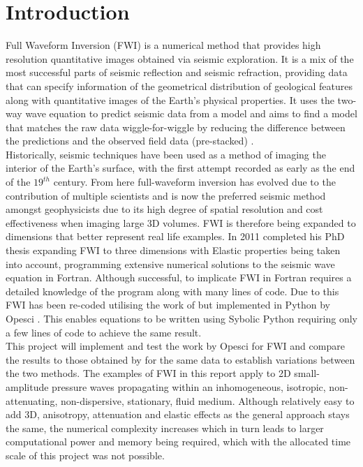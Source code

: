 \chapter{Introduction}
\label{intro}


Full Waveform Inversion (FWI) is a numerical method that provides high resolution quantitative images obtained via seismic exploration. It is a mix of the most successful parts of seismic reflection and seismic refraction, providing data that can specify information of the geometrical distribution of geological features along with quantitative images of the Earth's physical properties. 
It uses the two-way wave equation to predict seismic data from a model and aims to find a model that matches the raw data wiggle-for-wiggle by reducing the difference between the predictions and the observed field data (pre-stacked) \citep{tarantola2005inverse}. \\
 
Historically, seismic techniques have been used as a method of imaging the interior of the Earth's surface, with the first attempt recorded as early as the end of the $19^{th}$ century. From here full-waveform inversion has evolved due to the contribution of multiple scientists and is now the preferred seismic method amongst geophysicists due to its high degree of spatial resolution and cost effectiveness when imaging large 3D volumes. FWI is therefore being expanded to dimensions that better represent real life examples. In 2011 \citet{guasch20123d} completed his PhD thesis expanding FWI to three dimensions with Elastic properties being taken into account, programming extensive numerical solutions to the seismic wave equation in Fortran. Although successful, to implicate FWI in Fortran requires a detailed knowledge of the program along with many lines of code. Due to this FWI has been re-coded utilising the work of \citep{guasch20123d} but implemented in Python by Opesci  \citep{bworld}.  This enables equations to be written using Sybolic Python requiring only a few lines of code to achieve the same result. \\

This project will implement and test the work by Opesci for FWI and compare the results to those obtained by \citep{guasch20123d} for the same data to establish variations between the two methods. The examples of FWI in this report apply to 2D small-amplitude pressure waves propagating within an inhomogeneous, isotropic, non-attenuating, non-dispersive, stationary, fluid medium. Although relatively easy to add 3D, anisotropy, attenuation and elastic effects as the general approach stays the same, the numerical complexity increases which in turn leads to larger computational power and memory being required, which with the allocated time scale of this project was not possible. 
 

 